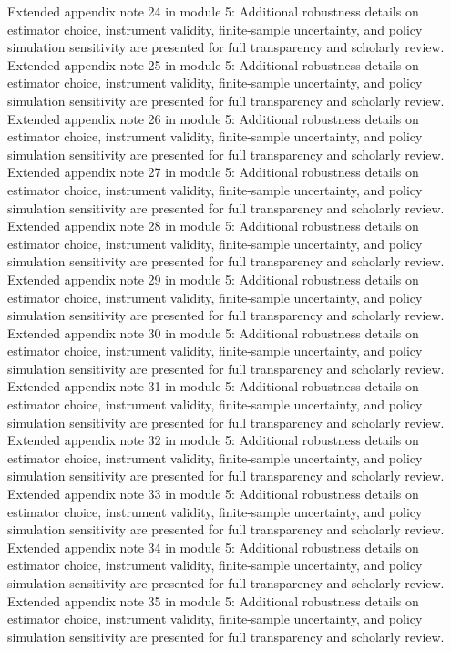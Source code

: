 \documentclass[preprint,12pt]{elsarticle}
\begin{document}
Extended appendix note 24 in module 5: Additional robustness details on estimator choice, instrument validity, finite-sample uncertainty, and policy simulation sensitivity are presented for full transparency and scholarly review.
Extended appendix note 25 in module 5: Additional robustness details on estimator choice, instrument validity, finite-sample uncertainty, and policy simulation sensitivity are presented for full transparency and scholarly review.
Extended appendix note 26 in module 5: Additional robustness details on estimator choice, instrument validity, finite-sample uncertainty, and policy simulation sensitivity are presented for full transparency and scholarly review.
Extended appendix note 27 in module 5: Additional robustness details on estimator choice, instrument validity, finite-sample uncertainty, and policy simulation sensitivity are presented for full transparency and scholarly review.
Extended appendix note 28 in module 5: Additional robustness details on estimator choice, instrument validity, finite-sample uncertainty, and policy simulation sensitivity are presented for full transparency and scholarly review.
Extended appendix note 29 in module 5: Additional robustness details on estimator choice, instrument validity, finite-sample uncertainty, and policy simulation sensitivity are presented for full transparency and scholarly review.
Extended appendix note 30 in module 5: Additional robustness details on estimator choice, instrument validity, finite-sample uncertainty, and policy simulation sensitivity are presented for full transparency and scholarly review.
Extended appendix note 31 in module 5: Additional robustness details on estimator choice, instrument validity, finite-sample uncertainty, and policy simulation sensitivity are presented for full transparency and scholarly review.
Extended appendix note 32 in module 5: Additional robustness details on estimator choice, instrument validity, finite-sample uncertainty, and policy simulation sensitivity are presented for full transparency and scholarly review.
Extended appendix note 33 in module 5: Additional robustness details on estimator choice, instrument validity, finite-sample uncertainty, and policy simulation sensitivity are presented for full transparency and scholarly review.
Extended appendix note 34 in module 5: Additional robustness details on estimator choice, instrument validity, finite-sample uncertainty, and policy simulation sensitivity are presented for full transparency and scholarly review.
Extended appendix note 35 in module 5: Additional robustness details on estimator choice, instrument validity, finite-sample uncertainty, and policy simulation sensitivity are presented for full transparency and scholarly review.
\end{document}
